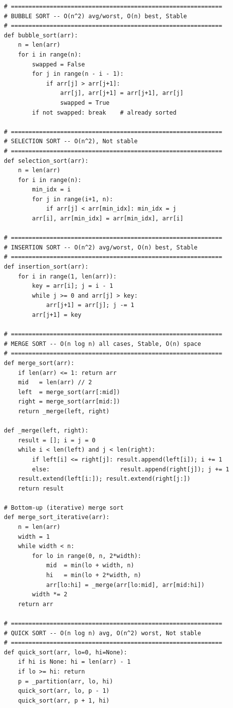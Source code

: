 \documentclass[11pt,a4paper]{report}
\begin{document}
\begin{lstlisting}
# ============================================================
# BUBBLE SORT -- O(n^2) avg/worst, O(n) best, Stable
# ============================================================
def bubble_sort(arr):
    n = len(arr)
    for i in range(n):
        swapped = False
        for j in range(n - i - 1):
            if arr[j] > arr[j+1]:
                arr[j], arr[j+1] = arr[j+1], arr[j]
                swapped = True
        if not swapped: break    # already sorted

# ============================================================
# SELECTION SORT -- O(n^2), Not stable
# ============================================================
def selection_sort(arr):
    n = len(arr)
    for i in range(n):
        min_idx = i
        for j in range(i+1, n):
            if arr[j] < arr[min_idx]: min_idx = j
        arr[i], arr[min_idx] = arr[min_idx], arr[i]

# ============================================================
# INSERTION SORT -- O(n^2) avg/worst, O(n) best, Stable
# ============================================================
def insertion_sort(arr):
    for i in range(1, len(arr)):
        key = arr[i]; j = i - 1
        while j >= 0 and arr[j] > key:
            arr[j+1] = arr[j]; j -= 1
        arr[j+1] = key

# ============================================================
# MERGE SORT -- O(n log n) all cases, Stable, O(n) space
# ============================================================
def merge_sort(arr):
    if len(arr) <= 1: return arr
    mid   = len(arr) // 2
    left  = merge_sort(arr[:mid])
    right = merge_sort(arr[mid:])
    return _merge(left, right)

def _merge(left, right):
    result = []; i = j = 0
    while i < len(left) and j < len(right):
        if left[i] <= right[j]: result.append(left[i]); i += 1
        else:                    result.append(right[j]); j += 1
    result.extend(left[i:]); result.extend(right[j:])
    return result

# Bottom-up (iterative) merge sort
def merge_sort_iterative(arr):
    n = len(arr)
    width = 1
    while width < n:
        for lo in range(0, n, 2*width):
            mid  = min(lo + width, n)
            hi   = min(lo + 2*width, n)
            arr[lo:hi] = _merge(arr[lo:mid], arr[mid:hi])
        width *= 2
    return arr

# ============================================================
# QUICK SORT -- O(n log n) avg, O(n^2) worst, Not stable
# ============================================================
def quick_sort(arr, lo=0, hi=None):
    if hi is None: hi = len(arr) - 1
    if lo >= hi: return
    p = _partition(arr, lo, hi)
    quick_sort(arr, lo, p - 1)
    quick_sort(arr, p + 1, hi)


\end{lstlisting}
\end{document}
